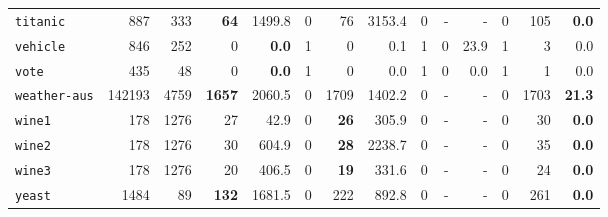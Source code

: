 \begin{tabular}{lccrrrrrrrrrrr}
\texttt{titanic} & \multicolumn{1}{r}{887} & \multicolumn{1}{r}{333}  & \textbf{64} & 1499.8 & 0 & 76 & 3153.4 & 0 & - & - & 0 & 105 & \textbf{0.0}\\
\texttt{vehicle} & \multicolumn{1}{r}{846} & \multicolumn{1}{r}{252}  & 0 & \textbf{0.0} & 1 & 0 & 0.1 & 1 & 0 & 23.9 & 1 & 3 & 0.0\\
\texttt{vote} & \multicolumn{1}{r}{435} & \multicolumn{1}{r}{48}  & 0 & \textbf{0.0} & 1 & 0 & 0.0 & 1 & 0 & 0.0 & 1 & 1 & 0.0\\
\texttt{weather-aus} & \multicolumn{1}{r}{142193} & \multicolumn{1}{r}{4759}  & \textbf{1657} & 2060.5 & 0 & 1709 & 1402.2 & 0 & - & - & 0 & 1703 & \textbf{21.3}\\
\texttt{wine1} & \multicolumn{1}{r}{178} & \multicolumn{1}{r}{1276}  & 27 & 42.9 & 0 & \textbf{26} & 305.9 & 0 & - & - & 0 & 30 & \textbf{0.0}\\
\texttt{wine2} & \multicolumn{1}{r}{178} & \multicolumn{1}{r}{1276}  & 30 & 604.9 & 0 & \textbf{28} & 2238.7 & 0 & - & - & 0 & 35 & \textbf{0.0}\\
\texttt{wine3} & \multicolumn{1}{r}{178} & \multicolumn{1}{r}{1276}  & 20 & 406.5 & 0 & \textbf{19} & 331.6 & 0 & - & - & 0 & 24 & \textbf{0.0}\\
\texttt{yeast} & \multicolumn{1}{r}{1484} & \multicolumn{1}{r}{89}  & \textbf{132} & 1681.5 & 0 & 222 & 892.8 & 0 & - & - & 0 & 261 & \textbf{0.0}\\
\bottomrule
\end{tabular}

